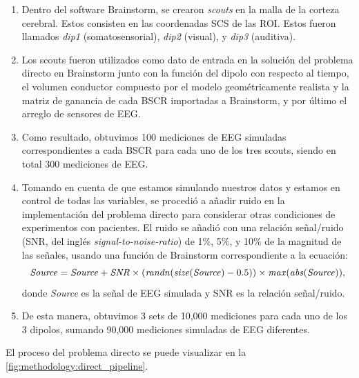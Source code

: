 \begin{enumerate}
	\item Dentro del software Brainstorm, se crearon \emph{scouts} en la malla de la corteza cerebral. Estos consisten en las coordenadas SCS de las ROI. Estos fueron llamados \emph{dip1} (somatosensorial), \emph{dip2} (visual), y \emph{dip3} (auditiva).
	\item Los scouts fueron utilizados como dato de entrada en la solución del problema directo en Brainstorm junto con la función del dipolo con respecto al tiempo, el volumen conductor compuesto por el modelo geométricamente realista y la matriz de ganancia de cada BSCR importadas a Brainstorm, y por último el arreglo de sensores de EEG.
	\item Como resultado, obtuvimos 100 mediciones de EEG simuladas correspondientes a cada BSCR para cada uno de los tres scouts, siendo en total 300 mediciones de EEG.
	\item Tomando en cuenta de que estamos simulando nuestros datos y estamos en control de todas las variables, se procedió a añadir ruido en la implementación del problema directo para considerar otras condiciones de experimentos con pacientes. El ruido se añadió con una relación señal/ruido (SNR, del inglés \emph{signal-to-noise-ratio}) de 1\%, 5\%, y 10\% de la magnitud de las señales, usando una función de Brainstorm correspondiente a la ecuación: 
	\begin{equation}
		\label{eq:snr}
		\text{\emph{Source}} = \text{\emph{Source}} + \text{\emph{SNR}}\times(\text{\emph{randn}}(\text{\emph{size}}(\text{\emph{Source}})-0.5)) \times \text{\emph{max}}(\text{\emph{abs}}(\text{\emph{Source}}))\text{,}
	\end{equation}
	donde \emph{Source} es la señal de EEG simulada y SNR es la relación señal/ruido.
	\item De esta manera, obtuvimos 3 sets de 10,000 mediciones para cada uno de los 3 dipolos, sumando 90,000 mediciones simuladas de EEG diferentes.
\end{enumerate}

El proceso del problema directo se puede visualizar en la \cref{fig:methodology:direct_pipeline}.

